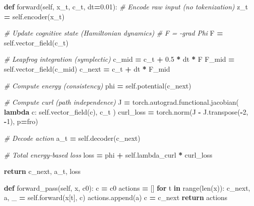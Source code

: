 \documentclass[
  11pt,
  a4paper,
]{article}
\newenvironment{Shaded}{\begin{snugshade}}{\end{snugshade}}
\newcommand{\BuiltInTok}[1]{#1}
\newcommand{\CommentTok}[1]{\textcolor[rgb]{0.56,0.35,0.01}{\textit{#1}}}
\newcommand{\ControlFlowTok}[1]{\textcolor[rgb]{0.13,0.29,0.53}{\textbf{#1}}}
\newcommand{\DecValTok}[1]{\textcolor[rgb]{0.00,0.00,0.81}{#1}}
\newcommand{\FloatTok}[1]{\textcolor[rgb]{0.00,0.00,0.81}{#1}}
\newcommand{\KeywordTok}[1]{\textcolor[rgb]{0.13,0.29,0.53}{\textbf{#1}}}
\newcommand{\NormalTok}[1]{#1}
\newcommand{\OperatorTok}[1]{\textcolor[rgb]{0.81,0.36,0.00}{\textbf{#1}}}
\newcommand{\StringTok}[1]{\textcolor[rgb]{0.31,0.60,0.02}{#1}}
\newcommand{\VariableTok}[1]{\textcolor[rgb]{0.00,0.00,0.00}{#1}}
\begin{document}
\begin{Shaded}
\begin{Highlighting}[]
    \KeywordTok{def}\NormalTok{ forward(}\VariableTok{self}\NormalTok{, x\_t, c\_t, dt}\OperatorTok{=}\FloatTok{0.01}\NormalTok{):}
        \CommentTok{\# Encode raw input (no tokenization)}
\NormalTok{        z\_t }\OperatorTok{=} \VariableTok{self}\NormalTok{.encoder(x\_t)}
        
        \CommentTok{\# Update cognitive state (Hamiltonian dynamics)}
        \CommentTok{\# F = {-}grad Phi}
\NormalTok{        F }\OperatorTok{=} \VariableTok{self}\NormalTok{.vector\_field(c\_t)}
        
        \CommentTok{\# Leapfrog integration (symplectic)}
\NormalTok{        c\_mid }\OperatorTok{=}\NormalTok{ c\_t }\OperatorTok{+} \FloatTok{0.5} \OperatorTok{*}\NormalTok{ dt }\OperatorTok{*}\NormalTok{ F}
\NormalTok{        F\_mid }\OperatorTok{=} \VariableTok{self}\NormalTok{.vector\_field(c\_mid)}
\NormalTok{        c\_next }\OperatorTok{=}\NormalTok{ c\_t }\OperatorTok{+}\NormalTok{ dt }\OperatorTok{*}\NormalTok{ F\_mid}
        
        \CommentTok{\# Compute energy (consistency)}
\NormalTok{        phi }\OperatorTok{=} \VariableTok{self}\NormalTok{.potential(c\_next)}
        
        \CommentTok{\# Compute curl (path independence)}
\NormalTok{        J }\OperatorTok{=}\NormalTok{ torch.autograd.functional.jacobian(}
            \KeywordTok{lambda}\NormalTok{ c: }\VariableTok{self}\NormalTok{.vector\_field(c), c\_t}
\NormalTok{        )}
\NormalTok{        curl\_loss }\OperatorTok{=}\NormalTok{ torch.norm(J }\OperatorTok{{-}}\NormalTok{ J.transpose(}\OperatorTok{{-}}\DecValTok{2}\NormalTok{, }\OperatorTok{{-}}\DecValTok{1}\NormalTok{), p}\OperatorTok{=}\StringTok{\textquotesingle{}fro\textquotesingle{}}\NormalTok{)}
        
        \CommentTok{\# Decode action}
\NormalTok{        a\_t }\OperatorTok{=} \VariableTok{self}\NormalTok{.decoder(c\_next)}
        
        \CommentTok{\# Total energy{-}based loss}
\NormalTok{        loss }\OperatorTok{=}\NormalTok{ phi }\OperatorTok{+} \VariableTok{self}\NormalTok{.lambda\_curl }\OperatorTok{*}\NormalTok{ curl\_loss}
        
        \ControlFlowTok{return}\NormalTok{ c\_next, a\_t, loss}
    
    \KeywordTok{def}\NormalTok{ forward\_pass(}\VariableTok{self}\NormalTok{, x, c0):}
\NormalTok{        c }\OperatorTok{=}\NormalTok{ c0}
\NormalTok{        actions }\OperatorTok{=}\NormalTok{ []}
        \ControlFlowTok{for}\NormalTok{ t }\KeywordTok{in} \BuiltInTok{range}\NormalTok{(}\BuiltInTok{len}\NormalTok{(x)):}
\NormalTok{            c\_next, a, \_ }\OperatorTok{=} \VariableTok{self}\NormalTok{.forward(x[t], c)}
\NormalTok{            actions.append(a)}
\NormalTok{            c }\OperatorTok{=}\NormalTok{ c\_next}
        \ControlFlowTok{return}\NormalTok{ actions}
\end{Highlighting}
\end{Shaded}
\end{document}
